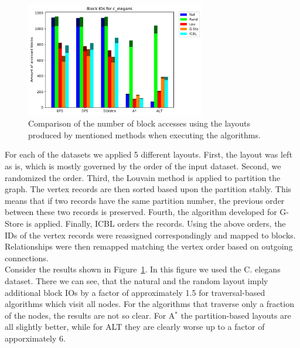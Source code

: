         \begin{figure}[htp]
        \begin{center}
            \includegraphics[keepaspectratio,width=0.7\textwidth]{img/07-eval/c_elegans_Block_unsorted_io_comparison.pdf}
        \end{center}
        \caption{Comparison of the number of block accesses using the layouts produced by mentioned methods when executing the algorithms.} 
        \label{celegans_b}
    \end{figure}

    For each of the datasets we applied 5 different layouts. 
    First, the layout was left as is, which is mostly governed by the order of the input dataset.
    Second, we randomized the order.
    Third, the Louvain method is applied to partition the graph. The vertex records are then sorted based upon the partition stably. This means that if two records have the same partition number, the previous order between these two records is preserved.
    Fourth, the algorithm developed for G-Store is applied.
    Finally, ICBL orders the records.
    Using the above orders, the IDs of the vertex records were reassigned correspondingly and mapped to blocks. 
    Relationships were then remapped matching the vertex order based on outgoing connections.\\
    Consider the results shown in Figure~\ref{celegans_b}. In this figure we used the C. elegans dataset.
    There we can see, that the natural and the random layout imply additional block IOs by a factor of approximately 1.5 for traversal-based algorithms which visit all nodes.
    For the algorithms that traverse only a fraction of the nodes, the results are not so clear. For A$^*$ the partition-based layouts are all slightly better, while for ALT they are clearly worse up to a factor of apporximately 6.
    
